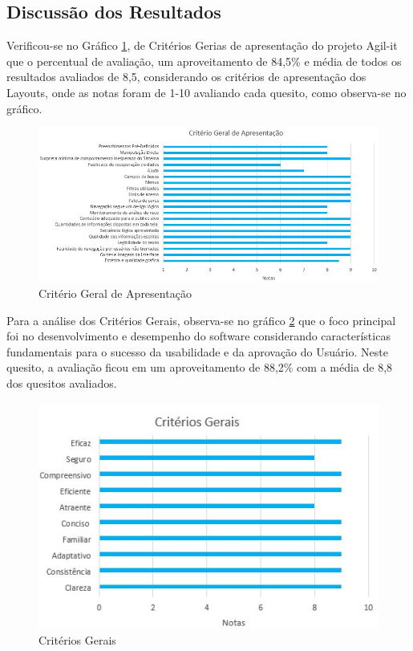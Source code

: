 \subsection{Discussão dos Resultados}

Verificou-se no Gráfico \ref{criterio-geral-apresentacao}, de Critérios Gerias de apresentação do projeto Agil-it que o percentual de avaliação, um aproveitamento de 84,5\% e média de todos os resultados avaliados de 8,5, considerando os critérios de apresentação dos Layouts, onde as notas foram de 1-10 avaliando cada quesito, como observa-se no gráfico.

\begin{figure}[htb]
	\caption{\label{criterio-geral-apresentacao}Critério Geral de Apresentação}
	\begin{center}
		\includegraphics[scale=0.60]{./Figuras/cap-8/criterio-geral-apresentacao.jpeg}
	\end{center}
\end{figure}

Para a análise dos Critérios Gerais, observa-se no gráfico \ref{criterios-gerais} que o foco principal foi no desenvolvimento e desempenho do software considerando características fundamentais para o sucesso da usabilidade e da aprovação do Usuário. Neste quesito, a avaliação ficou em um aproveitamento de 88,2\% com a média de 8,8 dos quesitos avaliados.

\begin{figure}[htb]
	\caption{\label{criterios-gerais}Critérios Gerais}
	\begin{center}
		\includegraphics[scale=0.60]{./Figuras/cap-8/criterios-gerais.jpeg}
	\end{center}
\end{figure}


